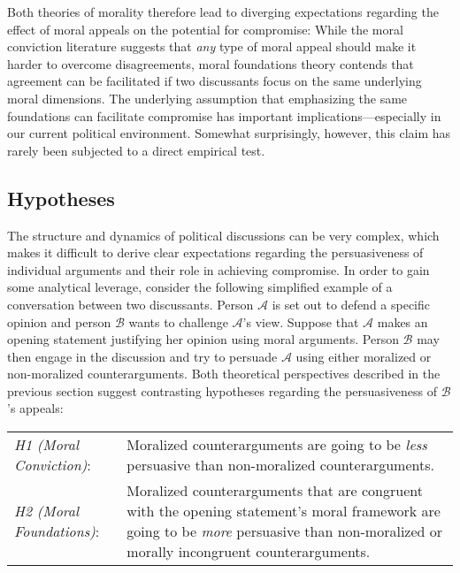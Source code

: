 Both theories of morality therefore lead to diverging expectations regarding the effect of moral appeals on the potential for compromise: While the moral conviction literature suggests that \textit{any} type of moral appeal should make it harder to overcome disagreements, moral foundations theory contends that agreement can be facilitated if two discussants focus on the same underlying moral dimensions. The underlying assumption that emphasizing the same foundations can facilitate compromise has important implications---especially in our current political environment. Somewhat surprisingly, however, this claim has rarely been subjected to a direct empirical test.



\subsection{Hypotheses}

The structure and dynamics of political discussions can be very complex, which makes it difficult to derive clear expectations regarding the persuasiveness of individual arguments and their role in achieving compromise. In order to gain some analytical leverage, consider the following simplified example of a conversation between two discussants. Person $\mathcal{A}$ is set out to defend a specific opinion and person $\mathcal{B}$ wants to challenge $\mathcal{A}$'s view. Suppose that $\mathcal{A}$ makes an opening statement justifying her opinion using moral arguments. Person $\mathcal{B}$ may then engage in the discussion and try to persuade $\mathcal{A}$ using either moralized or non-moralized counterarguments. Both theoretical perspectives described in the previous section suggest contrasting hypotheses regarding the persuasiveness of $\mathcal{B}$'s appeals:
\begin{center}\begin{tabularx}{\textwidth}{lX}
\textit{H1 (Moral Conviction)}: & Moralized counterarguments are going to be \textit{less} persuasive than non-moralized counterarguments.\\
\textit{H2 (Moral Foundations)}: & Moralized counterarguments that are congruent with the opening statement's moral framework are going to be \textit{more} persuasive than non-moralized or morally incongruent counterarguments.
\end{tabularx}\end{center}

